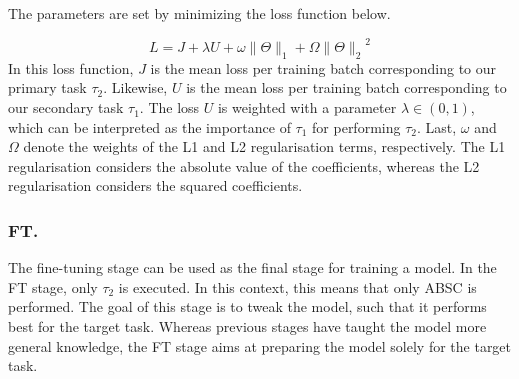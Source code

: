 

The parameters are set by minimizing the loss function below.

\begin{equation}
    L = J + \lambda U + \omega \|\Theta\|_1 + \Omega  {\|\Theta\|_2}^2
\end{equation}
In this loss function, $J$ is the mean loss per training batch corresponding to our primary task $\tau_2$. Likewise, $U$ is the mean loss per training batch corresponding to our secondary task $\tau_1$. The loss $U$ is weighted with a parameter $\lambda \in (0,1)$, which can be interpreted as the importance of $\tau_1$ for performing $\tau_2$. Last, $\omega$ and $\Omega$ denote the weights of the L1 and L2 regularisation terms, respectively. The L1 regularisation considers the absolute value of the coefficients, whereas the L2 regularisation considers the squared coefficients. 

\subsubsection{FT.}
The fine-tuning stage can be used as the final stage for training a model. In the FT stage, only $\tau_2$ is executed. In this context, this means that only ABSC is performed. The goal of this stage is to tweak the model, such that it performs best for the target task. Whereas previous stages have taught the model more general knowledge, the FT stage aims at preparing the model solely for the target task.

